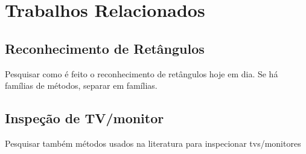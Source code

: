\chapter{Trabalhos Relacionados}


\section{Reconhecimento de Retângulos}

Pesquisar como é feito o reconhecimento de retângulos hoje em dia. Se há famílias de métodos, separar em famílias.

\section{Inspeção de TV/monitor}

Pesquisar também métodos usados na literatura para inspecionar tvs/monitores